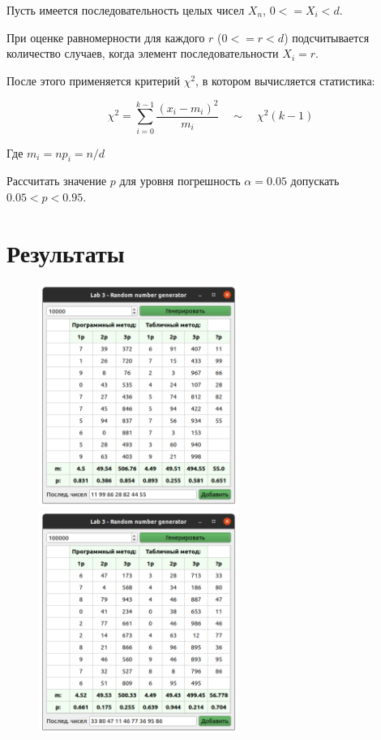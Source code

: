 Пусть имеется последовательность целых чисел $X_n$, $0 <= X_i < d$.

При оценке равномерности для каждого $r$ ($0 <= r < d$) подсчитывается количество случаев, когда элемент последовательности $X_i=r$.

После этого применяется критерий $\chi^2$, в котором вычисляется статистика: 

\begin{equation*}
	\chi^2 = \sum_{i = 0}^{k - 1} \frac{(x_i - m_i)^2}{m_i}
    \quad \sim \quad \chi^2(k-1)
\end{equation*}

Где $m_i = np_i = n/d$

Рассчитать значение $p$ для уровня погрешность $\alpha = 0.05$ допускать $0.05 < p < 0.95$.

\pagebreak
\section{Результаты}

\begin{figure}[h!]
    \centering
    \includegraphics[width=0.58\textwidth]{3/eg1}
    \includegraphics[width=0.58\textwidth]{3/eg2}
\end{figure}

